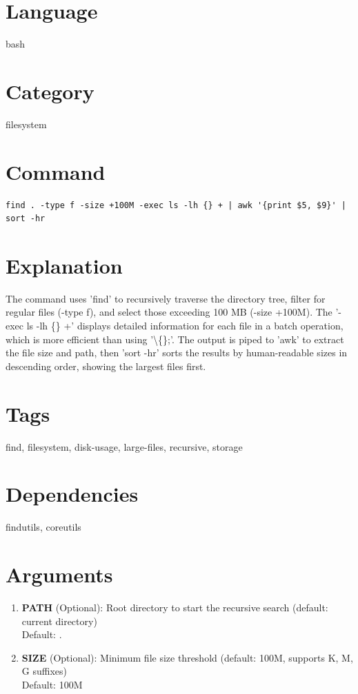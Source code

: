 \documentclass[openany]{book}
\begin{document}
\section*{Language}
bash

\section*{Category}
filesystem

\section*{Command}
\begin{lstlisting}
find . -type f -size +100M -exec ls -lh {} + | awk '{print $5, $9}' | sort -hr
\end{lstlisting}

\section*{Explanation}
The command uses 'find' to recursively traverse the directory tree, filter for regular files (-type f), and select those exceeding 100 MB (-size +100M). The '-exec ls -lh \{\} +' displays detailed information for each file in a batch operation, which is more efficient than using '\textbackslash\{\};'. The output is piped to 'awk' to extract the file size and path, then 'sort -hr' sorts the results by human-readable sizes in descending order, showing the largest files first.

\section*{Tags}
find, filesystem, disk-usage, large-files, recursive, storage

\section*{Dependencies}
findutils, coreutils


\section*{Arguments}
\begin{enumerate}
  \item \textbf{PATH} (Optional): Root directory to start the recursive search (default: current directory) \\ Default: .
  \item \textbf{SIZE} (Optional): Minimum file size threshold (default: 100M, supports K, M, G suffixes) \\ Default: 100M
\end{enumerate}
\end{document}
